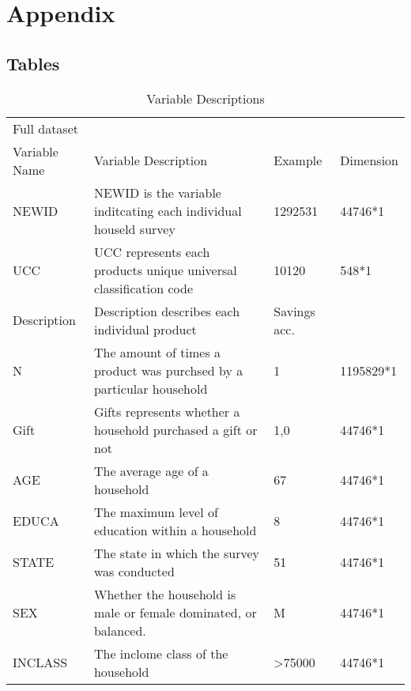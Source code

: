 \section{Appendix} %
\label{sec:appendix}


\subsection{Tables} %
\label{sub:tables}

\begin{table}[!h]
\centering
\caption{Variable Descriptions}
\label{my-label}
\begin{adjustbox}{angle=90}
\begin{tabular}{llll}
Full dataset  &                                                                                                                 &                   &           \\
Variable Name & Variable Description                                                                                            & Example           & Dimension \\
NEWID         & NEWID is the variable inditcating each individual houseld survey                                                & 1292531           & 44746*1   \\
UCC           & UCC represents each products unique universal classification code                                               & 10120             & 548*1     \\
Description   & Description describes each individual product                                                                   & Savings acc.      &           \\
N             & The amount of times a product was purchsed by a particular household                                            & 1                 & 1195829*1 \\
Gift          & Gifts represents whether a household purchased a gift or not & 1,0               & 44746*1   \\
AGE           & The average age of a household                                                                                  & 67                & 44746*1   \\
EDUCA         & The maximum level of education within a household                                                               & 8                 & 44746*1   \\
STATE         & The state in which the survey was conducted                                                                     & 51                & 44746*1   \\
SEX           & Whether the household is male or female dominated, or balanced.                                                 & M                 & 44746*1   \\
INCLASS       & The inclome class of the household                                                                              & \textgreater75000 & 44746*1  
\end{tabular}
\end{adjustbox}
\end{table}



